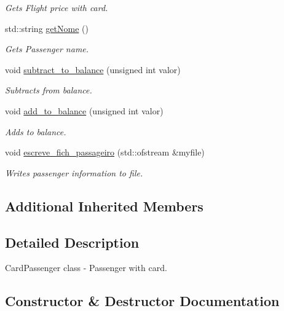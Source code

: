 \begin{DoxyCompactItemize}
\begin{DoxyCompactList}\small\item\em Gets Flight price with card. \end{DoxyCompactList}\item 
std\+::string \hyperlink{class_passageiro_cartao_a5323cda881d4ed94680f7c4e654a7456}{get\+Nome} ()
\begin{DoxyCompactList}\small\item\em Gets Passenger name. \end{DoxyCompactList}\item 
void \hyperlink{class_passageiro_cartao_ae6d6b0b1b1089b4904a0753c5446baa9}{subtract\+\_\+to\+\_\+balance} (unsigned int valor)
\begin{DoxyCompactList}\small\item\em Subtracts from balance. \end{DoxyCompactList}\item 
void \hyperlink{class_passageiro_cartao_ac1c2a6ef96d46ffd0a37e757d1e605a1}{add\+\_\+to\+\_\+balance} (unsigned int valor)
\begin{DoxyCompactList}\small\item\em Adds to balance. \end{DoxyCompactList}\item 
void \hyperlink{class_passageiro_cartao_a3c4167d97a0a71215970d7473f9629c1}{escreve\+\_\+fich\+\_\+passageiro} (std\+::ofstream \&myfile)
\begin{DoxyCompactList}\small\item\em Writes passenger information to file. \end{DoxyCompactList}\end{DoxyCompactItemize}
\subsection*{Additional Inherited Members}


\subsection{Detailed Description}
Card\+Passenger class -\/ Passenger with card. 

\subsection{Constructor \& Destructor Documentation}
\mbox{\label{class_passageiro_cartao_a057bea4531ca28f9ce41fb6ac3777e31}} 
